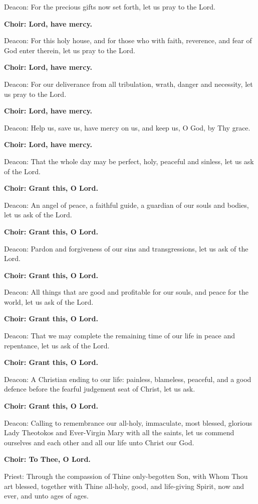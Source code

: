 \documentclass[12pt,a4paper,titlepage]{report}
\begin{document}
\begin{paracol}[1]{2}
  Deacon: For the precious gifts now set forth, let us pray to the Lord.

  \textbf{Choir: Lord, have mercy.}

  Deacon: For this holy house, and for those who with faith, reverence, and fear of God enter therein, let us pray to the Lord.

  \textbf{Choir: Lord, have mercy.}

  Deacon: For our deliverance from all tribulation, wrath, danger and necessity, let us pray to the Lord.

  \textbf{Choir: Lord, have mercy.}

  Deacon: Help us, save us, have mercy on us, and keep us, O God, by Thy grace.

  \textbf{Choir: Lord, have mercy.}

  Deacon: That the whole day may be perfect, holy, peaceful and sinless, let us ask of the Lord.

  \textbf{Choir: Grant this, O Lord.}

  Deacon: An angel of peace, a faithful guide, a guardian of our souls and bodies, let us ask of the Lord.

  \textbf{Choir: Grant this, O Lord.}

  Deacon: Pardon and forgiveness of our sins and transgressions, let us ask of the Lord.

  \textbf{Choir: Grant this, O Lord.}

  Deacon: All things that are good and profitable for our souls, and peace for the world, let us ask of the Lord.

  \textbf{Choir: Grant this, O Lord.}

  Deacon: That we may complete the remaining time of our life in peace and repentance, let us ask of the Lord.

  \textbf{Choir: Grant this, O Lord.}

  Deacon: A Christian ending to our life: painless, blameless, peaceful, and a good defence before the fearful judgement seat of Christ, let us ask.

  \textbf{Choir: Grant this, O Lord.}

  Deacon: Calling to remembrance our all-holy, immaculate, most blessed, glorious Lady Theotokos and Ever-Virgin Mary with all the saints, let us commend ourselves and each other and all our life unto Christ our God.

  \textbf{Choir: To Thee, O Lord.}

  Priest: Through the compassion of Thine only-begotten Son, with Whom Thou art blessed, together with Thine all-holy, good, and life-giving Spirit, now and ever, and unto ages of ages.


\end{paracol}
\end{document}
